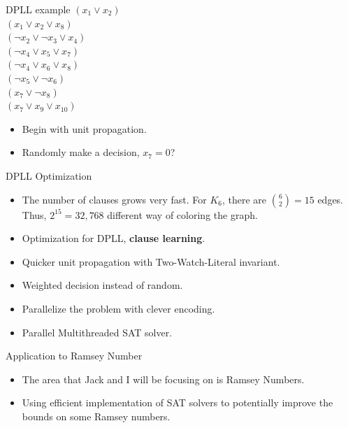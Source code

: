 \documentclass{beamer}
\begin{document}
\begin{frame}[t]{DPLL example}
	$(x_1 \vee x_2)$ \\
	$(x_1 \vee x_2 \vee x_8)$\\
	$(\neg x_2 \vee \neg x_3 \vee x_4)$\\
	$(\neg x_4 \vee x_5 \vee x_7)$\\
	$(\neg x_4 \vee x_6 \vee x_8)$\\
	$(\neg x_5 \vee \neg x_6)$\\
	$(x_7 \vee \neg x_8)$\\
	$(x_7 \vee x_9 \vee x_{10})$\\
	\bigbreak
	\begin{itemize}
		\item Begin with unit propagation.
		\item Randomly make a decision, $x_7 = 0$?
	\end{itemize}
	
\end{frame}


\begin{frame}{DPLL Optimization}
	\begin{itemize}
		\item The number of clauses grows very fast. For $K_6$, there are ${6 \choose 2} = 15$ edges. Thus, $2^{15} = 32,768$ different way of coloring the graph.
		\item Optimization for DPLL, \textbf{clause learning}.
		\item Quicker unit propagation with Two-Watch-Literal invariant.
		\item Weighted decision instead of random.
		\item Parallelize the problem with clever encoding.
		\item Parallel Multithreaded SAT solver.
	
	\end{itemize}
\end{frame}

\begin{frame}{Application to Ramsey Number}
	
	\begin{itemize}
		\item The area that Jack and I will be focusing on is Ramsey Numbers.
		\item Using efficient implementation of SAT solvers to potentially improve the bounds on some Ramsey numbers. 
	\end{itemize}
    
\end{frame}
\end{document}
